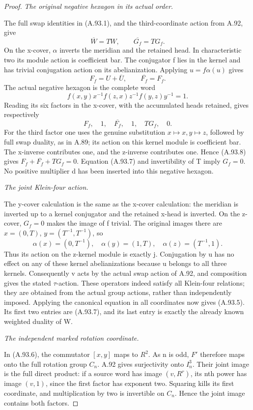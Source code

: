 \begin{proof}
\emph{The original negative hexagon in its actual order.}\par
The full swap identities in (A.93.1), and the third-coordinate
action from A.92, give
\[
            \overline W=TW,\qquad \overline{G_f}=TG_f.
\]
On the x-cover, \(\alpha\) inverts the meridian and the
retained head. In characteristic two its module action is
coefficient bar. The conjugator f lies in the kernel and has
trivial conjugation action on its abelianization. Applying
\(u=f\alpha(u)\) gives
\[
                   F_f=U+\overline U,
                   \qquad \overline{F_f}=F_f.
\tag{A.93.7}
\]
The actual negative hexagon is the complete word
\[
        f(x,y)x^{-1}f(z,x)z^{-1}f(y,z)y^{-1}=1.
\tag{A.93.8}
\]
Reading its six factors in the x-cover, with the accumulated
heads retained, gives respectively
\[
                   F_f,\quad 1,\quad \overline{F_f},
                        \quad 1,\quad TG_f,\quad 0.
\tag{A.93.9}
\]
For the third factor one uses the genuine substitution
\(x\mapsto x,y\mapsto z\), followed by full swap duality,
as in A.89; its action on this kernel module is coefficient
bar. The x-inverse contributes one, and the z-inverse contributes
one. Hence (A.93.8) gives
\(F_f+\overline{F_f}+TG_f=0\). Equation (A.93.7) and
invertibility of T imply \(G_f=0\). No positive multiplier d
has been inserted into this negative hexagon.

\emph{The joint Klein-four action.}\par
The y-cover calculation is the same as the x-cover calculation:
the meridian is inverted up to a kernel conjugator and the
retained x-head is inverted. On the z-cover, \(G_f=0\)
makes the image of f trivial. The original images there are
\(x=(0,T)\), \(y=(T^{-1},T^{-1})\), so
\[
 \alpha(x)=(0,T^{-1}),\quad
 \alpha(y)=(1,T),\quad \alpha(z)=(T^{-1},1).
\]
Thus its action on the z-kernel module is exactly j.
Conjugation by u has no effect on any of these kernel
abelianizations because u belongs to all three kernels.
Consequently v acts by the actual swap action of A.92, and
composition gives the stated \(\tau\)-action. These operators
indeed satisfy all Klein-four relations; they are obtained from
the actual group actions, rather than independently imposed.
Applying the canonical equation in all coordinates now gives
(A.93.5). Its first two entries are (A.93.7), and its last
entry is exactly the already known weighted duality of W.

\emph{The independent marked rotation coordinate.}\par
In (A.93.6), the commutator \([x,y]\) maps to \(R^2\).
As n is odd, \(F'\) therefore maps onto the full rotation
group \(C_n\). A.92 gives surjectivity onto \(I_n^3\).
Their joint image is the full direct product: if a source
word has image \((v,R^r)\), its nth power has image \((v,1)\),
since the first factor has exponent two. Squaring kills its
first coordinate, and multiplication by two is invertible
on \(C_n\). Hence the joint image contains both factors.


\end{proof}
